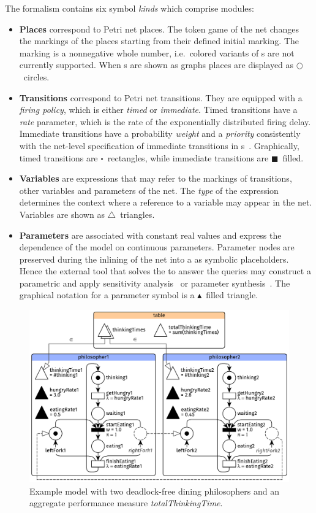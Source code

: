 The  formalism contains six symbol \emph{kinds} which comprise  modules:
\begin{itemize}
\item \textbf{Places} correspond to Petri net places. The token game of the net changes the markings of the places starting from their defined initial marking. The marking is a nonnegative whole number, i.e.~colored variants of s are not currently supported. When s are shown as graphs places are displayed as \(\bigcirc\)~circles.
\item \textbf{Transitions} correspond to Petri net transitions. They are equipped with a \emph{firing policy}, which is either \emph{timed} or \emph{immediate}. Timed transitions have a \emph{rate} parameter, which is the rate of the exponentially distributed firing delay. Immediate transitions have a probability \emph{weight} and a \emph{priority} consistently with the net-level specification of immediate transitions in s~\citep{}. Graphically, timed transitions are \(\square\)~rectangles, while immediate transitions are \(\blacksquare\)~filled.
\item \textbf{Variables} are expressions that may refer to the markings of transitions, other variables and parameters of the net. The \emph{type} of the expression determines the context where a reference to a variable may appear in the net. Variables are shown as \(\triangle\)~triangles.
\item \textbf{Parameters} are associated with constant real values and express the dependence of the model on continuous parameters. Parameter nodes are preserved during the inlining of the net into a  as symbolic placeholders. Hence the external tool that solves the  to answer the queries may construct a parametric  and apply sensitivity analysis~ or parameter synthesis~. The graphical notation for a parameter symbol is a \(\blacktriangle\)~filled triangle.
\end{itemize}

\begin{figure}
  \centering
  \includegraphics[scale=0.9]{figures/rgspn_example}
  \caption{Example  model with two deadlock-free dining philosophers and an aggregate performance measure \textit{totalThinkingTime}.}
\end{figure}

